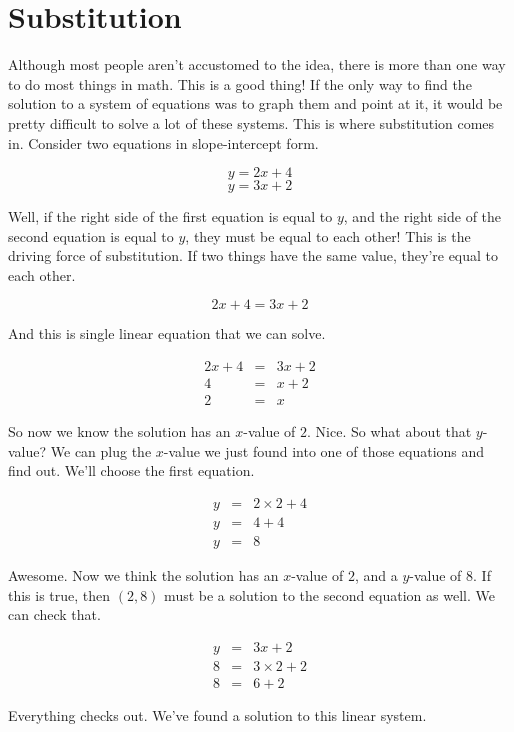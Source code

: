 \section{Substitution}

Although most people aren't accustomed to the idea, there is more than one way to do most things in math.  This is a good thing!  If the only way to find the solution to a system of equations was to graph them and point at it, it would be pretty difficult to solve a lot of these systems.  This is where substitution comes in.  Consider two equations in slope-intercept form.

$$y = 2x + 4$$
$$y = 3x + 2$$



Well, if the right side of the first equation is equal to $y$, and the right side of the second equation is equal to $y$, they must be equal to each other!  This is the driving force of substitution.  If two things have the same value, they're equal to each other.

$$2x + 4 = 3x + 2$$

And this is single linear equation that we can solve.

$$\begin{array}{rcl}
2x + 4 & = & 3x + 2\\
4 & = & x + 2 \\
2 & = & x \end{array}$$

So now we know the solution has an $x$-value of $2$.  Nice.  So what about that $y$-value?  We can plug the $x$-value we just found into one of those equations and find out.  We'll choose the first equation.

$$\begin{array}{rcl}
y & = & 2\times2 + 4\\
y & = & 4 + 4\\
y & = & 8 \end{array}$$

Awesome.  Now we think the solution has an $x$-value of $2$, and a $y$-value of $8$.  If this is true, then $(2,8)$ must be a solution to the second equation as well.  We can check that.

$$\begin{array}{rcl}
y & = & 3x + 2 \\
8 & = & 3\times 2 + 2\\
8 & = & 6 + 2 \end{array}$$

Everything checks out.  We've found a solution to this linear system.

